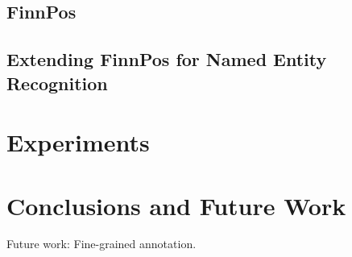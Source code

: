\documentclass[11pt]{article}
\begin{document}
\subsection{FinnPos}



\subsection{Extending FinnPos for Named Entity Recognition}




\section{Experiments}
\label{sec: experiments}




\section{Conclusions and Future Work}
\label{sec: conclusions}


Future work: Fine-grained annotation.



\newpage

%

\end{document}
